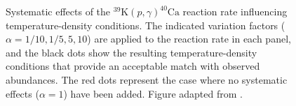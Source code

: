 \begin{figure}[t]
\centering
\noindent
{}
\caption{\label{fig:39K_p_g_Sens}Systematic effects of the $^{39}\mathrm{K}(p,\gamma)^{40}\mathrm{Ca}$ reaction rate influencing temperature-density conditions. The indicated variation factors ($\alpha = 1/10, 1/5, 5, 10$) are applied to the reaction rate in each panel, and the black dots show the resulting temperature-density conditions that provide an acceptable match with observed abundances. The red dots represent the case where no systematic effects ($\alpha=1$) have been added. Figure adapted from \cite{Dermigny2017}.}
\end{figure}

